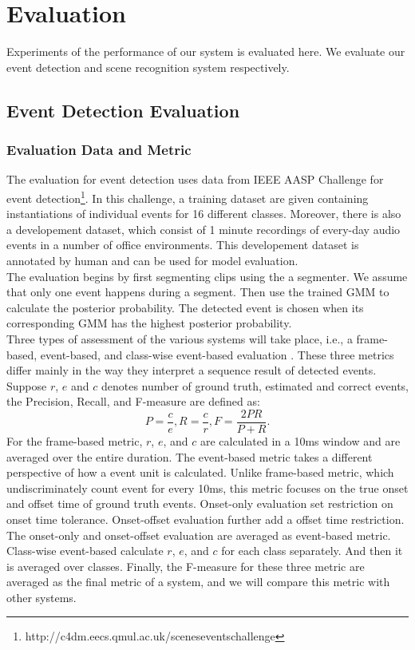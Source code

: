 \chapter{Evaluation}
Experiments of the performance of our system is evaluated here. 
We evaluate our event detection and scene recognition system respectively. 

\section{Event Detection Evaluation}
\subsection{Evaluation Data and Metric}
The evaluation for event detection uses data from IEEE AASP Challenge for event detection\footnote{http://c4dm.eecs.qmul.ac.uk/sceneseventschallenge}.  
In this challenge, a training dataset are given containing instantiations of individual events for 16 different classes. 
Moreover, there is also a developement dataset, which consist of 1 minute recordings of every-day audio events in a number of office environments. 
This developement dataset is annotated by human and can be used for model evaluation. \\ 

The evaluation begins by first segmenting clips using the a segmenter. 
We assume that only one event happens during a segment. 
Then use the trained GMM to calculate the posterior probability. 
The detected event is chosen when its corresponding GMM has the highest posterior probability.\\ 
 
Three types of assessment of the various systems will take place, i.e., a frame-based, event-based, and class-wise event-based evaluation \cite{giannoulis2013database}.  These three metrics differ mainly in the way they interpret a sequence result of detected events.  
Suppose $r$, $e$ and $c$ denotes number of ground truth, estimated and correct events, the Precision, Recall, and F-measure are defined as: 
\begin{equation}
	P = \frac{c}{e}, R = \frac{c}{r}, F = \frac{2PR}{P+R}.  
\end{equation}
For the frame-based metric, $r$, $e$, and $c$ are calculated in a 10ms window and are averaged over the entire duration. 
The event-based metric takes a different perspective of how a event unit is calculated. 
Unlike frame-based metric, which undiscriminately count event for every 10ms, this metric focuses on the true onset and offset time of ground truth events. 
Onset-only evaluation set restriction on onset time tolerance. 
Onset-offset evaluation further add a offset time restriction. 
The onset-only and onset-offset evaluation are averaged as event-based metric. 
Class-wise event-based calculate $r$, $e$, and $c$ for each class separately. And then it is averaged over classes. 
Finally, the F-measure for these three metric are averaged as the final metric of a system, and we will compare this metric with other systems. 

